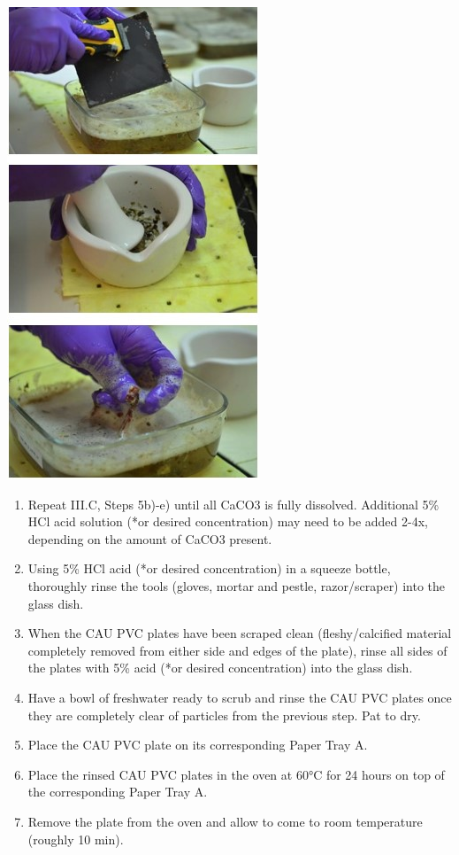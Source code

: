 \documentclass[
]{book}
\begin{document}
\includegraphics{images/CAU_dissolve.jpg}

\begin{enumerate}
\def\labelenumi{\arabic{enumi}.}
\setcounter{enumi}{5}
\item
  Repeat III.C, Steps 5b)-e) until all CaCO3 is fully dissolved. Additional 5\% HCl acid solution (*or desired concentration) may need to be added 2-4x, depending on the amount of CaCO3 present.
\item
  Using 5\% HCl acid (*or desired concentration) in a squeeze bottle, thoroughly rinse the tools (gloves, mortar and pestle, razor/scraper) into the glass dish.
\item
  When the CAU PVC plates have been scraped clean (fleshy/calcified material completely removed from either side and edges of the plate), rinse all sides of the plates with 5\% acid (*or desired concentration) into the glass dish.
\item
  Have a bowl of freshwater ready to scrub and rinse the CAU PVC plates once they are completely clear of particles from the previous step. Pat to dry.
\item
  Place the CAU PVC plate on its corresponding Paper Tray A.
\item
  Place the rinsed CAU PVC plates in the oven at 60°C for 24 hours on top of the corresponding Paper Tray A.
\item
  Remove the plate from the oven and allow to come to room temperature (roughly 10 min).
\end{enumerate}
\end{document}
